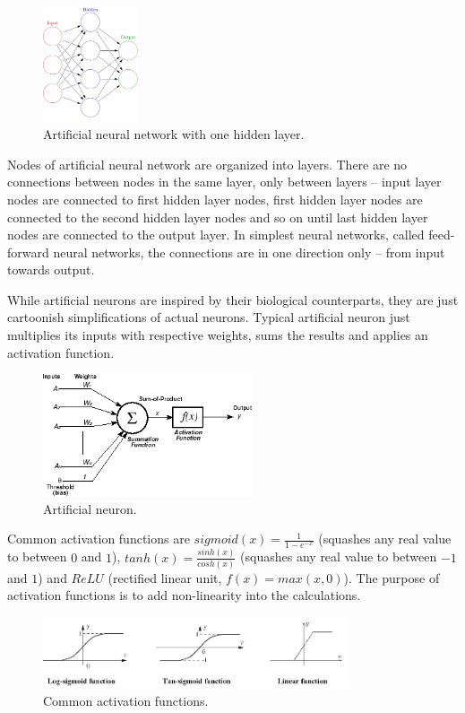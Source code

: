 \documentclass[a4paper,11pt]{article}
\begin{document}
\begin{figure}[h]
	\centering
	\includegraphics[width=0.25\textwidth]{ann.png}
	\caption{Artificial neural network with one hidden layer.}
\end{figure}

Nodes of artificial neural network are organized into layers. There are no connections between nodes in the same layer, only between layers -- input layer nodes are connected to first hidden layer nodes, first hidden layer nodes are connected to the second hidden layer nodes and so on until last hidden layer nodes are connected to the output layer. In simplest neural networks, called feed-forward neural networks, the connections are in one direction only -- from input towards output.

While artificial neurons are inspired by their biological counterparts, they are just cartoonish simplifications of actual neurons. Typical artificial neuron just multiplies its inputs with respective weights, sums the results and applies an activation function. 

\begin{figure}[h]
	\centering
	\includegraphics[width=0.55\textwidth]{neuron.png}
	\caption{Artificial neuron.}
\end{figure}

Common activation functions are $sigmoid(x)=\frac{1}{1 - e^{-x}}$ (squashes any real value to between $0$ and $1$), $tanh(x)=\frac{sinh(x)}{cosh(x)}$ (squashes any real value to between $-1$ and $1$) and $ReLU$ (rectified linear unit, $f(x)=max(x, 0)$). The purpose of activation functions is to add non-linearity into the calculations.

\begin{figure}[h]
	\centering
	\includegraphics[width=0.8\textwidth]{activation_functions.png}
	\caption{Common activation functions.}
\end{figure}
\end{document}
